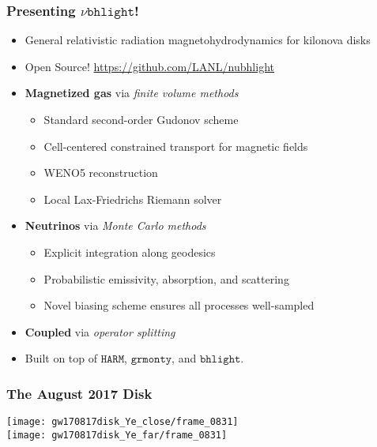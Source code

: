 \documentclass[]{beamer}
\begin{document}
\begin{frame}
  \frametitle{Presenting $\nu\texttt{bhlight}$!}
  \begin{itemize}
  \item General relativistic radiation magnetohydrodynamics for
    kilonova disks
  \item Open Source! {\color{blue}\url{https://github.com/LANL/nubhlight}}
  \item \textbf{Magnetized gas} via \textit{finite volume methods}
    \begin{itemize}
    \item Standard second-order Gudonov scheme
    \item Cell-centered constrained transport for magnetic fields
    \item WENO5 reconstruction
    \item Local Lax-Friedrichs Riemann solver
    \end{itemize}
  \item \textbf{Neutrinos} via \textit{Monte Carlo methods}
    \begin{itemize}
    \item Explicit integration along geodesics
    \item Probabilistic emissivity, absorption, and scattering
    \item Novel biasing scheme ensures all processes well-sampled
    \end{itemize}
  \item \textbf{Coupled} via \textit{operator splitting}
  \item Built on top of $\texttt{HARM}$, $\texttt{grmonty}$, and
    $\texttt{bhlight}$.
  \end{itemize}
\end{frame}

\begin{frame}
  \frametitle{The August 2017 Disk}
  \begin{center}
    \texttt{[image: gw170817disk\_Ye\_close/frame\_0831]} \\
    \texttt{[image: gw170817disk\_Ye\_far/frame\_0831]} 
  \end{center}
\end{frame}
\end{document}
